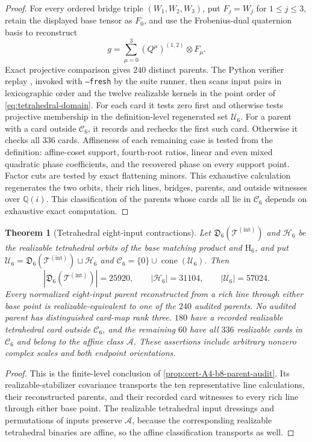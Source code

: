 \documentclass[11pt,letterpaper,onecolumn]{article}
\theoremstyle{plain}
\newtheorem{theorem}{Theorem}[section]
\theoremstyle{definition}
\theoremstyle{remark}
\newcommand{\cA}{\mathscr A}
\newcommand{\TetInt}{{\mathcal T^{(\mathrm{int})}}}
\newcommand{\Hcore}{\mathrm{H}_6}
\begin{document}
\begin{proof}
For every ordered bridge triple \((W_1,W_2,W_3)\), put
\(F_j=W_j\) for \(1\le j\le3\), retain the displayed base tensor as
\(F_0\), and use the Frobenius-dual quaternion basis to reconstruct
\[
 g=\sum_{\mu=0}^3(Q^\mu)^{(1,2)}\otimes F_\mu.
\]
Exact projective comparison gives \(240\) distinct parents.  The Python verifier
replay , invoked with \texttt{--fresh} by
the suite runner, then scans input pairs in lexicographic order and the twelve realizable
kernels in the point order of \cref{eq:tetrahedral-domain}.  For each card it
tests zero first and otherwise tests projective membership in the
definition-level regenerated set \(\mathscr U_6\).
For a parent with a card outside \(\mathscr C_6\), it records and rechecks the first such card. Otherwise it checks all \(336\) cards.  Affineness of each remaining case
is tested from the definition: affine-coset support, fourth-root ratios,
linear and even mixed quadratic phase coefficients, and the recovered phase
on every support point.  Factor cuts are tested by exact flattening minors.
This exhaustive calculation regenerates the two orbits, their rich
lines, bridges, parents, and outside witnesses over \(\mathbb Q(i)\).
This classification of the parents whose cards all lie in \(\mathscr C_6\) depends on exhaustive exact computation.
\end{proof}

\begin{theorem}[Tetrahedral eight-input contractions]
\label{thm:cert-interface-A4-q8}
Let \(\mathfrak D_6(\TetInt)\) and \(\mathscr H_6\) be the realizable tetrahedral orbits of
the base matching product and \(\Hcore\), and put
\(\mathscr U_6=\mathfrak D_6(\TetInt)\sqcup\mathscr H_6\) and
\(\mathscr C_6=\{0\}\cup\operatorname{cone}(\mathscr U_6)\).  Then
\[
 |\mathfrak D_6(\TetInt)|=25920,\qquad |\mathscr H_6|=31104,\qquad
 |\mathscr U_6|=57024.
\]
Every normalized eight-input parent reconstructed from a rich line through
either base point is realizable-equivalent to one of the \(240\) audited
parents.  No audited parent has distinguished card-map rank three. \(180\)
have a recorded realizable tetrahedral card outside \(\mathscr C_6\), and the
remaining \(60\) have all \(336\) realizable cards in \(\mathscr C_6\) and belong to the
affine class \(\cA\).  These assertions include arbitrary nonzero
complex scales and both endpoint orientations.
\end{theorem}

\begin{proof}
This is the finite-level conclusion of
\cref{prop:cert-A4-b8-parent-audit}.  Its realizable-stabilizer covariance
transports the ten representative line calculations, their reconstructed
parents, and their recorded card witnesses to every rich line through either
base point.  The realizable tetrahedral input dressings and permutations of inputs
preserve \(\cA\), because the corresponding realizable tetrahedral binaries are
affine, so the affine classification transports as well.
\end{proof}
\end{document}
